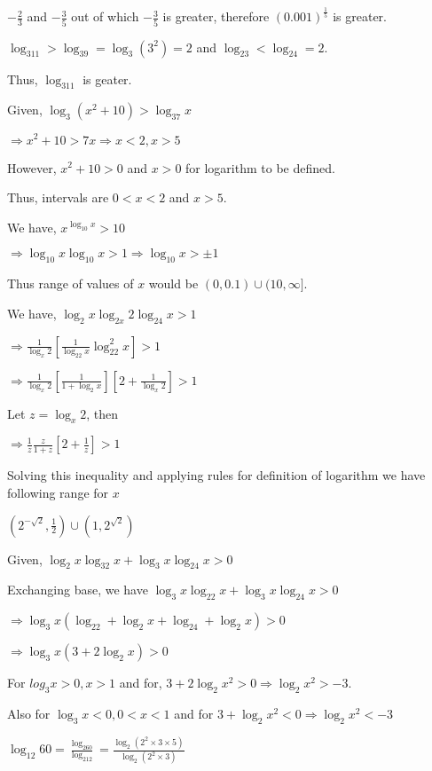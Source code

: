   $-\frac{2}{3}$ and $-\frac{3}{5}$ out of which $-\frac{3}{5}$ is greater, therefore $(0.001)^{\tfrac{1}{5}}$ is greater.
\item $\log_311 > \log_39 = \log_3(3^2) = 2$ and $\log_23 < \log_24 = 2$.

  Thus, $\log_311$ is geater.
\item Given, $\log_3(x^2 + 10) > \log_37x$

  $\Rightarrow x^2 + 10 > 7x \Rightarrow x < 2, x > 5$

  However, $x^2 + 10 > 0$ and $x > 0$ for logarithm to be defined.

  Thus, intervals are $0 < x < 2$ and $x > 5$.
\item We have, $x^{\log_{10}x} > 10$

  $\Rightarrow \log_{10}x\log_{10}x > 1 \Rightarrow \log_{10}x > \pm 1$

  Thus range of values of $x$ would be $(0, 0.1)\cup(10, \infty]$.
\item We have, $\log_2x\log_{2x}2\log_24x > 1$

  $\Rightarrow \frac{1}{\log_x2}\left[\frac{1}{\log_22x}\log_22^2x\right] > 1$

  $\Rightarrow \frac{1}{\log_x2}\left[\frac{1}{1 + \log_2x}\right]\left[2 + \frac{1}{\log_x2}\right] > 1$

  Let $z = \log_x2$, then

  $\Rightarrow \frac{1}{z}\frac{z}{1 + z}\left[2 + \frac{1}{z}\right] > 1$

  Solving this inequality and applying rules for definition of logarithm we have following range for $x$

  $\left(2^{-\sqrt{2}}, \frac{1}{2}\right)\cup\left(1, 2^{\sqrt{2}}\right)$
\item Given, $\log_2x\log_32x + \log_3x\log_24x > 0$

  Exchanging base, we have $\log_3x\log_22x + \log_3x\log_24x > 0$

  $\Rightarrow \log_3x(\log_22 + \log_2x + \log_24 + \log_2x) > 0$

  $\Rightarrow \log_3x(3 + 2\log_2x) > 0$

  For $log_3x > 0, x > 1$ and for, $3 + 2\log_2x^2 > 0 \Rightarrow \log_2x^2 > -3$.

  Also for $\log_3x < 0, 0 <x < 1$ and for $3 + \log_2x^2 < 0 \Rightarrow \log_2x^2 < -3$
\item $\log_{12}60 = \frac{\log_260}{\log_212} = \frac{\log_2(2^2\times3\times5)}{\log_2(2^2\times3)}$

